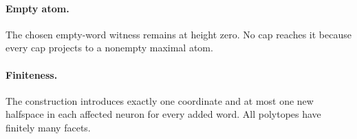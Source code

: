 \paragraph{Empty atom.}
The chosen empty-word witness remains at height zero.  No cap reaches it because every cap projects to a nonempty maximal atom.

\paragraph{Finiteness.}
The construction introduces exactly one coordinate and at most one new halfspace in each affected neuron for every added word.  All polytopes have finitely many facets.
